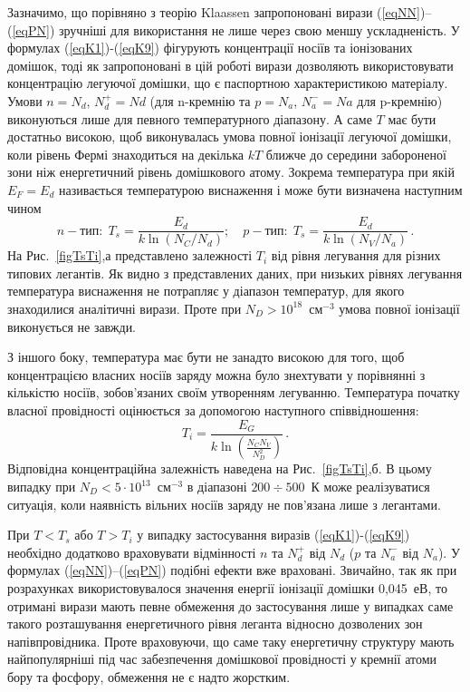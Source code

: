 \documentclass[12pt,a4paper,titlepage,oneside]{book}
\numberwithin{equation}{part}
\begin{document}
Зазначимо, що порівняно з теорію Klaassen запропоновані вирази (\ref{eqNN})--(\ref{eqPN}) зручніші для використання не лише через свою меншу ускладненість.
У формулах (\ref{eqK1})-(\ref{eqK9}) фігурують концентрації носіїв та іонізованих домішок, тоді як запропоновані в цій роботі вирази
дозволяють використовувати концентрацію легуючої домішки, що є паспортною характеристикою матеріалу.
Умови $n=N_d$, $N_d^+=Nd$ (для n-кремнію та $p=N_a$, $N_a^-=Na$ для p-кремнію) виконуються лише для певного температурного діапазону.
А саме $T$ має бути достатньо високою, щоб виконувалась умова повної іонізації легуючої домішки,
коли рівень Фермі знаходиться на декілька $kT$ ближче до середини забороненої зони
ніж енергетичний рівень домішкового атому.
Зокрема температура при якій $E_F=E_d$ називається температурою виснаження і може бути визначена наступним чином
\begin{equation}\label{eqTs}
  n-\text{тип}:\;T_s=\frac{E_d}{k\ln(N_C/N_d)};\quad p-\text{тип}:\;T_s=\frac{E_d}{k\ln(N_V/N_a)}\,.
\end{equation}
На Рис.~\ref{figTsTi},а представлено залежності $T_i$ від рівня легування для різних типових легантів.
Як видно з представлених даних, при низьких рівнях легування температура виснаження не потрапляє
у діапазон температур, для якого знаходилися аналітичні вирази.
Проте при $N_D>10^{18}$~см$^{-3}$ умова повної іонізації виконується не завжди.

З іншого боку, температура має бути не занадто високою для того, щоб концентрацією власних носіїв заряду можна було знехтувати
у порівнянні з кількістю носіїв, зобов'язаних своїм утворенням легуванню.
Температура початку власної провідності оцінюється за допомогою наступного співвідношення:
\begin{equation}\label{eqTi}
  T_i=\frac{E_G}{k \ln\left(\frac{N_C N_V}{N_D^2}\right)}\,.
\end{equation}
Відповідна концентраційна залежність наведена на Рис.~\ref{figTsTi},б.
В цьому випадку при $N_D<5\cdot 10^{13}$~см$^{-3}$ в діапазоні $200\div500$~К може реалізуватися ситуація,
коли наявність вільних носіїв заряду не пов'язана лише з легантами.



При $T<T_s$ або $T>T_i$ у випадку застосування виразів (\ref{eqK1})-(\ref{eqK9}) необхідно додатково враховувати
відмінності $n$ та $N_d^+$ від $N_d$ ($p$ та $N_a^-$ від $N_a$).
У формулах (\ref{eqNN})--(\ref{eqPN}) подібні ефекти вже враховані.
Звичайно, так як при розрахунках використовувалося значення енергії іонізації домішки 0,045~еВ, то отримані 
вирази мають певне обмеження до застосування лише у випадках саме такого розташування енергетичного рівня леганта відносно дозволених зон
напівпровідника.
Проте враховуючи, що саме таку енергетичну структуру мають найпопулярніші під час забезпечення домішкової провідності у кремнії атоми бору та фосфору, 
обмеження не є надто жорстким.
\end{document}
